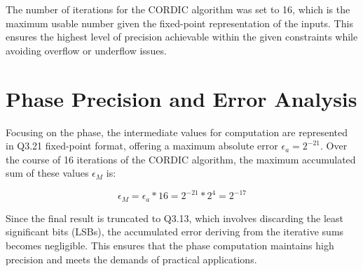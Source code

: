 The number of iterations for the CORDIC algorithm was set to 16, which is the maximum usable number given the fixed-point representation of the inputs. This ensures the highest level of precision achievable within the given constraints while avoiding overflow or underflow issues.

\section{Phase Precision and Error Analysis}
Focusing on the phase, the intermediate values for computation are represented in Q3.21 fixed-point format, offering a maximum absolute error \( \epsilon_a = 2^{-21} \).
Over the course of 16 iterations of the CORDIC algorithm, the maximum accumulated sum of these values \( \epsilon_M \) is:

\[
    \epsilon_M = \epsilon_a * 16 = 2^{-21} * 2^4 = 2^{-17}
\]

Since the final result is truncated to Q3.13, which involves discarding the least significant bits (LSBs), 
the accumulated error deriving from the iterative sums becomes negligible. This ensures that the phase computation 
maintains high precision and meets the demands of practical applications.